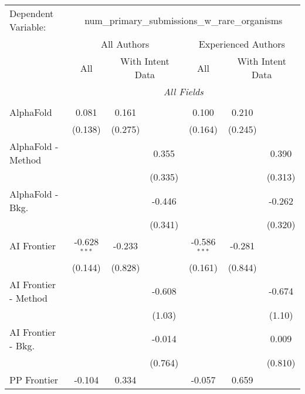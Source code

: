 \begingroup
\centering
\begin{tabular}{lcccccc}
   \tabularnewline \midrule \midrule
   Dependent Variable: & \multicolumn{6}{c}{num\_primary\_submissions\_w\_rare\_organisms}\\
 & \multicolumn{3}{c}{All Authors} & \multicolumn{3}{c}{Experienced Authors} \\
\cmidrule(lr){2-4} \cmidrule(lr){5-7}
 & \multicolumn{1}{c}{All} & \multicolumn{2}{c}{With Intent Data} & \multicolumn{1}{c}{All} & \multicolumn{2}{c}{With Intent Data} \\
\cmidrule(lr){2-2} \cmidrule(lr){3-4} \cmidrule(lr){5-5} \cmidrule(lr){6-7}
 & \multicolumn{6}{c}{\textit{All Fields}} \\ \\
   AlphaFold            & 0.081          & 0.161   &              & 0.100          & 0.210   &   \\   
                        & (0.138)        & (0.275) &              & (0.164)        & (0.245) &   \\   
   AlphaFold - Method   &                &         & 0.355        &                &         & 0.390\\   
                        &                &         & (0.335)      &                &         & (0.313)\\   
   AlphaFold - Bkg.     &                &         & -0.446       &                &         & -0.262\\   
                        &                &         & (0.341)      &                &         & (0.320)\\   
   AI Frontier          & -0.628$^{***}$ & -0.233  &              & -0.586$^{***}$ & -0.281  &   \\   
                        & (0.144)        & (0.828) &              & (0.161)        & (0.844) &   \\   
   AI Frontier - Method &                &         & -0.608       &                &         & -0.674\\   
                        &                &         & (1.03)       &                &         & (1.10)\\   
   AI Frontier - Bkg.   &                &         & -0.014       &                &         & 0.009\\   
                        &                &         & (0.764)      &                &         & (0.810)\\   
   PP Frontier          & -0.104         & 0.334   &              & -0.057         & 0.659   &   \\   

\end{tabular}
